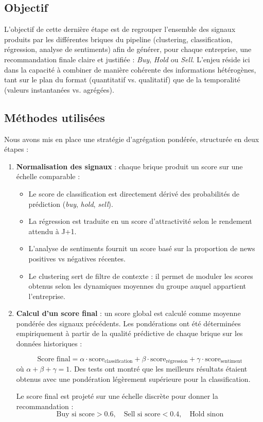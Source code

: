 \documentclass[a4paper,12pt]{article}
\begin{document}
\subsection*{Objectif}

L’objectif de cette dernière étape est de regrouper l’ensemble des signaux produits par les différentes briques du pipeline (clustering, classification, régression, analyse de sentiments) afin de générer, pour chaque entreprise, une recommandation finale claire et justifiée : \textit{Buy}, \textit{Hold} ou \textit{Sell}. L’enjeu réside ici dans la capacité à combiner de manière cohérente des informations hétérogènes, tant sur le plan du format (quantitatif vs. qualitatif) que de la temporalité (valeurs instantanées vs. agrégées).

\subsection*{Méthodes utilisées}

Nous avons mis en place une stratégie d’agrégation pondérée, structurée en deux étapes :

\begin{enumerate}
  \item \textbf{Normalisation des signaux} : chaque brique produit un score sur une échelle comparable :
  \begin{itemize}
    \item Le score de classification est directement dérivé des probabilités de prédiction (\textit{buy}, \textit{hold}, \textit{sell}).
    \item La régression est traduite en un score d’attractivité selon le rendement attendu à J+1.
    \item L’analyse de sentiments fournit un score basé sur la proportion de news positives vs négatives récentes.
    \item Le clustering sert de filtre de contexte : il permet de moduler les scores obtenus selon les dynamiques moyennes du groupe auquel appartient l’entreprise.
  \end{itemize}

  \item \textbf{Calcul d’un score final} : un score global est calculé comme moyenne pondérée des signaux précédents. Les pondérations ont été déterminées empiriquement à partir de la qualité prédictive de chaque brique sur les données historiques :

  \[
  \text{Score final} = \alpha \cdot \text{score}_{\text{classification}} + \beta \cdot \text{score}_{\text{régression}} + \gamma \cdot \text{score}_{\text{sentiment}}
  \]
  où $\alpha + \beta + \gamma = 1$. Des tests ont montré que les meilleurs résultats étaient obtenus avec une pondération légèrement supérieure pour la classification.

  Le score final est projeté sur une échelle discrète pour donner la recommandation :
  \[
  \text{Buy si score} > 0.6,\quad \text{Sell si score} < 0.4,\quad \text{Hold sinon}
  \]
\end{enumerate}
\end{document}
